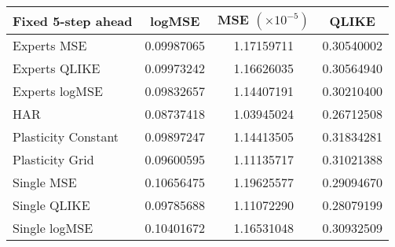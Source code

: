 
\begin{tabular}{l|c|c|c}
Fixed 5-step ahead     & logMSE & MSE $(\times 10^{-5})$ & QLIKE \\\hline
Experts MSE & 0.09987065 & 1.17159711 & 0.30540002\\ 
Experts QLIKE & 0.09973242 & 1.16626035 & 0.30564940\\ 
Experts logMSE & 0.09832657 & 1.14407191 & 0.30210400\\ 
HAR & 0.08737418 & 1.03945024 & 0.26712508\\ 
Plasticity Constant & 0.09897247 & 1.14413505 & 0.31834281\\ 
Plasticity Grid & 0.09600595 & 1.11135717 & 0.31021388\\ 
Single MSE & 0.10656475 & 1.19625577 & 0.29094670\\ 
Single QLIKE & 0.09785688 & 1.11072290 & 0.28079199\\ 
Single logMSE & 0.10401672 & 1.16531048 & 0.30932509\\ 
\end{tabular}